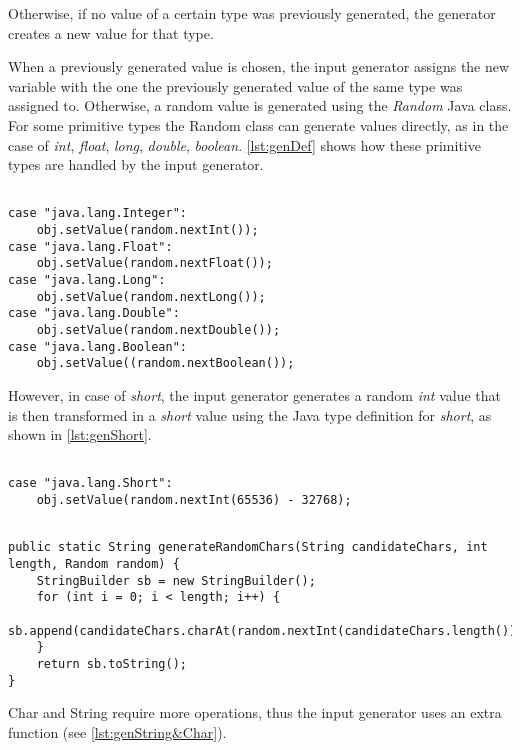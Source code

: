 Otherwise, if no value of a certain type was previously generated, the generator creates a new value for that type.

When a previously generated value is chosen, the input generator assigns the new variable with the one the previously generated value of the same type was assigned to. Otherwise, a random value is generated using the \textit{Random} Java class. For some primitive types the Random class can generate values directly, as in the case of \textit{int}, \textit{float}, \textit{long}, \textit{double}, \textit{boolean}. \autoref{lst:genDef} shows how these primitive types are handled by the input generator. 

\begin{lstlisting}[caption={Random default generator},label={lst:genDef}]% Start your code-block

case "java.lang.Integer":
	obj.setValue(random.nextInt());
case "java.lang.Float":
	obj.setValue(random.nextFloat());
case "java.lang.Long":
	obj.setValue(random.nextLong());
case "java.lang.Double":
	obj.setValue(random.nextDouble());
case "java.lang.Boolean":
	obj.setValue((random.nextBoolean());
\end{lstlisting}

However, in case of \textit{short}, the input generator generates a random \textit{int} value that is then transformed in a \textit{short} value using the Java type definition for \textit{short}, as shown in \autoref{lst:genShort}.

\begin{lstlisting}[caption={Random short generator},label={lst:genShort}]% Start your code-block
	
case "java.lang.Short":
	obj.setValue(random.nextInt(65536) - 32768);
\end{lstlisting}

\begin{lstlisting}[caption={Random String/char generator},label={lst:genString&Char}]% Start your code-block

public static String generateRandomChars(String candidateChars, int length, Random random) {
	StringBuilder sb = new StringBuilder();
	for (int i = 0; i < length; i++) {
		sb.append(candidateChars.charAt(random.nextInt(candidateChars.length())));
	}
	return sb.toString();
}
\end{lstlisting}

Char and String require more operations, thus the input generator uses an extra function (see \autoref{lst:genString&Char}).

